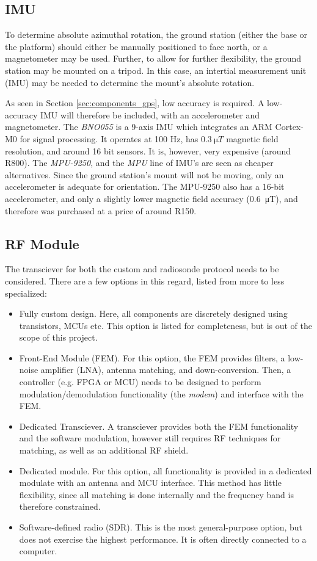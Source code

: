 \subsection{IMU}
To determine absolute azimuthal rotation, the ground station (either the base or the platform) should either be manually positioned to face north, or a magnetometer may be used. Further, to allow for further flexibility, the ground station may be mounted on a tripod. In this case, an intertial measurement unit (IMU) may be needed to determine the mount's absolute rotation.

As seen in Section \ref{sec:components_gps}, low accuracy is required. A low-accuracy IMU will therefore be included, with an accelerometer and magnetometer. The \textit{BNO055} is a 9-axis IMU which integrates an ARM Cortex-M0 for signal processing. It operates at 100 Hz, has $\SI{0.3}{\micro T}$ magnetic field resolution, and around 16 bit sensors. It is, however, very expensive (around R800). The \textit{MPU-9250}, and the \textit{MPU} line of IMU's are seen as cheaper alternatives. Since the ground station's mount will not be moving, only an accelerometer is adequate for orientation. The MPU-9250 also has a 16-bit accelerometer, and only a slightly lower magnetic field accuracy (\SI{0.6}{\micro T}), and therefore was purchased at a price of around R150.

\subsection{RF Module}
The transciever for both the custom and radiosonde protocol needs to be considered. There are a few options in this regard, listed from more to less specialized:
\begin{itemize}
    \item Fully custom design. Here, all components are discretely designed using transistors, MCUs etc. This option is listed for completeness, but is out of the scope of this project.
    \item Front-End Module (FEM). For this option, the FEM provides filters, a low-noise amplifier (LNA), antenna matching, and down-conversion. Then, a controller (e.g. FPGA or MCU) needs to be designed to perform modulation/demodulation functionality (the \textit{modem}) and interface with the FEM.
    \item Dedicated Transciever. A transciever provides both the FEM functionality and the software modulation, however still requires RF techniques for matching, as well as an additional RF shield.
    \item Dedicated module. For this option, all functionality is provided in a dedicated modulate with an antenna and MCU interface. This method has little flexibility, since all matching is done internally and the frequency band is therefore constrained.
    \item Software-defined radio (SDR). This is the most general-purpose option, but does not exercise the highest performance. It is often directly connected to a computer.
\end{itemize}

